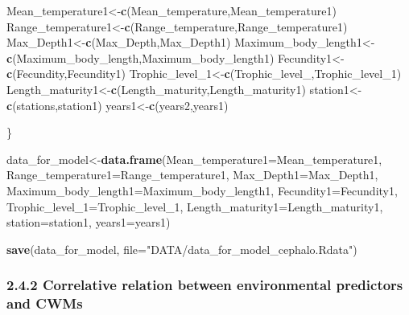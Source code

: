 \documentclass[
]{article}
\newenvironment{Shaded}{\begin{snugshade}}{\end{snugshade}}
\newcommand{\AttributeTok}[1]{\textcolor[rgb]{0.13,0.29,0.53}{#1}}
\newcommand{\FunctionTok}[1]{\textcolor[rgb]{0.13,0.29,0.53}{\textbf{#1}}}
\newcommand{\NormalTok}[1]{#1}
\newcommand{\OtherTok}[1]{\textcolor[rgb]{0.56,0.35,0.01}{#1}}
\newcommand{\StringTok}[1]{\textcolor[rgb]{0.31,0.60,0.02}{#1}}
\begin{document}
\begin{Shaded}
\begin{Highlighting}[]
\NormalTok{  Mean\_temperature1}\OtherTok{\textless{}{-}}\FunctionTok{c}\NormalTok{(Mean\_temperature,Mean\_temperature1)}
\NormalTok{  Range\_temperature1}\OtherTok{\textless{}{-}}\FunctionTok{c}\NormalTok{(Range\_temperature,Range\_temperature1)}
\NormalTok{  Max\_Depth1}\OtherTok{\textless{}{-}}\FunctionTok{c}\NormalTok{(Max\_Depth,Max\_Depth1)}
\NormalTok{  Maximum\_body\_length1}\OtherTok{\textless{}{-}}\FunctionTok{c}\NormalTok{(Maximum\_body\_length,Maximum\_body\_length1)}
\NormalTok{  Fecundity1}\OtherTok{\textless{}{-}}\FunctionTok{c}\NormalTok{(Fecundity,Fecundity1)}
\NormalTok{  Trophic\_level\_1}\OtherTok{\textless{}{-}}\FunctionTok{c}\NormalTok{(Trophic\_level\_,Trophic\_level\_1)}
\NormalTok{  Length\_maturity1}\OtherTok{\textless{}{-}}\FunctionTok{c}\NormalTok{(Length\_maturity,Length\_maturity1)}
\NormalTok{  station1}\OtherTok{\textless{}{-}}\FunctionTok{c}\NormalTok{(stations,station1)}
\NormalTok{  years1}\OtherTok{\textless{}{-}}\FunctionTok{c}\NormalTok{(years2,years1)}
  
\NormalTok{\}}


\NormalTok{data\_for\_model}\OtherTok{\textless{}{-}}\FunctionTok{data.frame}\NormalTok{(}\AttributeTok{Mean\_temperature1=}\NormalTok{Mean\_temperature1,}
                           \AttributeTok{Range\_temperature1=}\NormalTok{Range\_temperature1,}
                           \AttributeTok{Max\_Depth1=}\NormalTok{Max\_Depth1,}
                           \AttributeTok{Maximum\_body\_length1=}\NormalTok{Maximum\_body\_length1,}
                           \AttributeTok{Fecundity1=}\NormalTok{Fecundity1,}
                           \AttributeTok{Trophic\_level\_1=}\NormalTok{Trophic\_level\_1,}
                           \AttributeTok{Length\_maturity1=}\NormalTok{Length\_maturity1,}
                           \AttributeTok{station=}\NormalTok{station1, }
                           \AttributeTok{years1=}\NormalTok{years1)}


\FunctionTok{save}\NormalTok{(data\_for\_model, }\AttributeTok{file=}\StringTok{"DATA/data\_for\_model\_cephalo.Rdata"}\NormalTok{)}
\end{Highlighting}
\end{Shaded}

\subsubsection{2.4.2 Correlative relation between environmental
predictors and
CWMs}\label{correlative-relation-between-environmental-predictors-and-cwms}
\end{document}
